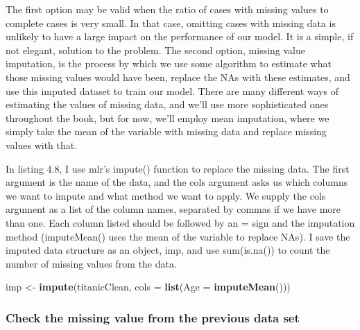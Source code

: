 \documentclass[
]{article}
\newenvironment{Shaded}{\begin{snugshade}}{\end{snugshade}}
\newcommand{\AttributeTok}[1]{\textcolor[rgb]{0.13,0.29,0.53}{#1}}
\newcommand{\FunctionTok}[1]{\textcolor[rgb]{0.13,0.29,0.53}{\textbf{#1}}}
\newcommand{\NormalTok}[1]{#1}
\newcommand{\OtherTok}[1]{\textcolor[rgb]{0.56,0.35,0.01}{#1}}
\newcommand{\SpecialCharTok}[1]{\textcolor[rgb]{0.81,0.36,0.00}{\textbf{#1}}}
\begin{document}
The first option may be valid when the ratio of cases with missing
values to complete cases is very small. In that case, omitting cases
with missing data is unlikely to have a large impact on the performance
of our model. It is a simple, if not elegant, solution to the problem.
The second option, missing value imputation, is the process by which we
use some algorithm to estimate what those missing values would have
been, replace the NAs with these estimates, and use this imputed dataset
to train our model. There are many different ways of estimating the
values of missing data, and we'll use more sophisticated ones throughout
the book, but for now, we'll employ mean imputation, where we simply
take the mean of the variable with missing data and replace missing
values with that.

In listing 4.8, I use mlr's impute() function to replace the missing
data. The first argument is the name of the data, and the cols argument
asks us which columns we want to impute and what method we want to
apply. We supply the cols argument as a list of the column names,
separated by commas if we have more than one. Each column listed should
be followed by an = sign and the imputation method (imputeMean() uses
the mean of the variable to replace NAs). I save the imputed data
structure as an object, imp, and use sum(is.na()) to count the number of
missing values from the data.

\begin{Shaded}
\begin{Highlighting}[]
\NormalTok{imp }\OtherTok{\textless{}{-}} \FunctionTok{impute}\NormalTok{(titanicClean, }\AttributeTok{cols =} \FunctionTok{list}\NormalTok{(}\AttributeTok{Age =} \FunctionTok{imputeMean}\NormalTok{()))}
\end{Highlighting}
\end{Shaded}

\subsubsection{Check the missing value from the previous data
set}\label{check-the-missing-value-from-the-previous-data-set}

\begin{Shaded}
\end{Shaded}
\end{document}
